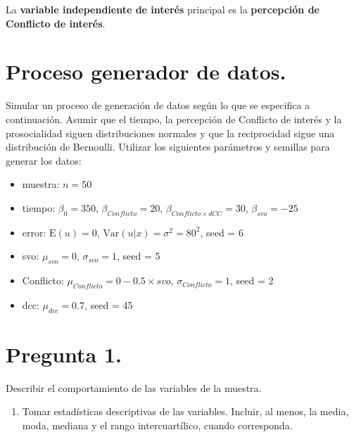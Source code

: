 \documentclass[
  spanish,
  10pt,
]{article}
\providecommand{\tightlist}{%
  \setlength{\itemsep}{0pt}\setlength{\parskip}{0pt}}
\begin{document}
La \textbf{variable independiente de interés} principal es la
\textbf{percepción de Conflicto de interés}.

\section{Proceso generador de datos.}\label{proceso-generador-de-datos.}

Simular un proceso de generación de datos según lo que se especifica a
continuación. Asumir que el tiempo, la percepción de Conflicto de
interés y la prosocialidad siguen distribuciones normales y que la
reciprocidad sigue una distribución de Bernoulli. Utilizar los
siguientes parámetros y semillas para generar los datos:

\begin{itemize}
\tightlist
\item
  muestra: \(n = 50\)
\item
  tiempo: \(\beta_0 = 350\), \(\beta_{Conflicto} = 20\),
  \(\beta_{Conflicto \times dCC} = 30\), \(\beta_{svo} = -25\)
\item
  error: \(\mathrm{E}(u) = 0\), \(\mathrm{Var}(u|x) = \sigma^2 = 80^2\),
  seed = 6
\item
  svo: \(\mu_{svo} = 0\), \(\sigma_{svo} = 1\), seed = 5
\item
  Conflicto: \(\mu_{Conflicto} = 0 - 0.5 \times svo\),
  \(\sigma_{Conflicto} = 1\), seed = 2
\item
  dcc: \(\mu_{dcc} = 0.7\), seed = 45
\end{itemize}

\newpage

\section{Pregunta 1.}\label{pregunta-1.}

Describir el comportamiento de las variables de la muestra.

\begin{enumerate}
\def\labelenumi{(\alph{enumi})}
\tightlist
\item
  Tomar estadísticas descriptivas de las variables. Incluir, al menos,
  la media, moda, mediana y el rango intercuartílico, cuando
  corresponda.
\end{enumerate}
\end{document}
